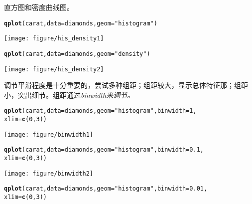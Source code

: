 \documentclass{article}\usepackage[]{graphicx}\usepackage[]{color}
\makeatletter
\def\maxwidth{ %
  \ifdim\Gin@nat@width>\linewidth
    \linewidth
  \else
    \Gin@nat@width
  \fi
}
\newcommand{\hlnum}[1]{\textcolor[rgb]{0.686,0.059,0.569}{#1}}%
\newcommand{\hlstr}[1]{\textcolor[rgb]{0.192,0.494,0.8}{#1}}%
\newcommand{\hlstd}[1]{\textcolor[rgb]{0.345,0.345,0.345}{#1}}%
\newcommand{\hlkwc}[1]{\textcolor[rgb]{0.333,0.667,0.333}{#1}}%
\newcommand{\hlkwd}[1]{\textcolor[rgb]{0.737,0.353,0.396}{\textbf{#1}}}%
\newenvironment{kframe}{%
 \def\at@end@of@kframe{}%
 \ifinner\ifhmode%
  \def\at@end@of@kframe{\end{minipage}}%
  \begin{minipage}{\columnwidth}%
 \fi\fi%
 \def\FrameCommand##1{\hskip\@totalleftmargin \hskip-\fboxsep
 \colorbox{shadecolor}{##1}\hskip-\fboxsep
     \hskip-\linewidth \hskip-\@totalleftmargin \hskip\columnwidth}%
 \MakeFramed {\advance\hsize-\width
   \@totalleftmargin\z@ \linewidth\hsize
   \@setminipage}}%
 {\par\unskip\endMakeFramed%
 \at@end@of@kframe}
\newenvironment{knitrout}{}{} %
\makeatother
\begin{document}
\begin{CJK*}{UTF8}{gkai}
\begin{knitrout}
\end{knitrout}
直方图和密度曲线图。
\begin{knitrout}
\color{fgcolor}\begin{kframe}
\begin{alltt}
\hlkwd{qplot}\hlstd{(carat,} \hlkwc{data} \hlstd{= diamonds,} \hlkwc{geom} \hlstd{=} \hlstr{"histogram"}\hlstd{)}
\end{alltt}


{\ttfamily\noindent\itshape\color{messagecolor}{\#\# stat\_bin: binwidth defaulted to range/30. Use 'binwidth = x' to adjust this.}}\end{kframe}
\texttt{[image: figure/his\_density1]} 
\begin{kframe}\begin{alltt}
\hlkwd{qplot}\hlstd{(carat,} \hlkwc{data} \hlstd{= diamonds,} \hlkwc{geom} \hlstd{=} \hlstr{"density"}\hlstd{)}
\end{alltt}
\end{kframe}
\texttt{[image: figure/his\_density2]} 

\end{knitrout}
调节平滑程度是十分重要的，尝试多种组距；组距较大，显示总体特征那；组距小，突出细节。组距通过\em{binwidth}来调节。
\begin{knitrout}
\color{fgcolor}\begin{kframe}
\begin{alltt}
\hlkwd{qplot}\hlstd{(carat,} \hlkwc{data} \hlstd{= diamonds,} \hlkwc{geom} \hlstd{=} \hlstr{"histogram"}\hlstd{,} \hlkwc{binwidth} \hlstd{=} \hlnum{1}\hlstd{,}
      \hlkwc{xlim} \hlstd{=} \hlkwd{c}\hlstd{(}\hlnum{0}\hlstd{,} \hlnum{3}\hlstd{))}
\end{alltt}
\end{kframe}
\texttt{[image: figure/binwidth1]} 
\begin{kframe}\begin{alltt}
\hlkwd{qplot}\hlstd{(carat,} \hlkwc{data} \hlstd{= diamonds,} \hlkwc{geom} \hlstd{=} \hlstr{"histogram"}\hlstd{,} \hlkwc{binwidth} \hlstd{=} \hlnum{0.1}\hlstd{,}
      \hlkwc{xlim} \hlstd{=} \hlkwd{c}\hlstd{(}\hlnum{0}\hlstd{,} \hlnum{3}\hlstd{))}
\end{alltt}
\end{kframe}
\texttt{[image: figure/binwidth2]} 
\begin{kframe}\begin{alltt}
\hlkwd{qplot}\hlstd{(carat,} \hlkwc{data} \hlstd{= diamonds,} \hlkwc{geom} \hlstd{=} \hlstr{"histogram"}\hlstd{,} \hlkwc{binwidth} \hlstd{=} \hlnum{0.01}\hlstd{,}
      \hlkwc{xlim} \hlstd{=} \hlkwd{c}\hlstd{(}\hlnum{0}\hlstd{,} \hlnum{3}\hlstd{))}
\end{alltt}



\end{kframe}
\end{knitrout}
\end{CJK*}
\end{document}
